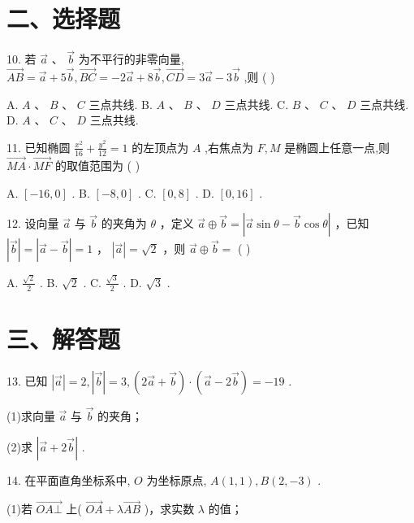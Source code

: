 \section*{二、选择题}

10. 若 $\overrightarrow{a}\text{ 、 }\overrightarrow{b}$ 为不平行的非零向量, $\overrightarrow{AB} = \overrightarrow{a} + 5\overrightarrow{b},\overrightarrow{BC} =  - 2\overrightarrow{a} + 8\overrightarrow{b},\overrightarrow{CD} = 3\overrightarrow{a} - 3\overrightarrow{b}$ ,则 ( )

A. $A\text{ 、 }B\text{ 、 }C$ 三点共线. B. $A\text{ 、 }B\text{ 、 }D$ 三点共线. C. $B\text{ 、 }C\text{ 、 }D$ 三点共线. D. $A\text{ 、 }C\text{ 、 }D$ 三点共线.

11. 已知椭圆 $\frac{{x}^{2}}{16} + \frac{{y}^{2}}{12} = 1$ 的左顶点为 $A$ ,右焦点为 $F,M$ 是椭圆上任意一点,则 $\overrightarrow{MA} \cdot  \overrightarrow{MF}$ 的取值范围为 ( )

A. $\left\lbrack  {-{16},0}\right\rbrack$ . B. $\left\lbrack  {-8,0}\right\rbrack$ . C. $\left\lbrack  {0,8}\right\rbrack$ . D. $\left\lbrack  {0,{16}}\right\rbrack$ .

12. 设向量 $\overrightarrow{a}$ 与 $\overrightarrow{b}$ 的夹角为 $\theta$ ，定义 $\overrightarrow{a} \oplus  \overrightarrow{b} = \left| {\overrightarrow{a}\sin \theta  - \overrightarrow{b}\cos \theta }\right|$ ，已知 $\left| \overrightarrow{b}\right|  = \left| {\overrightarrow{a} - \overrightarrow{b}}\right|  = 1$ ， $\left| \overrightarrow{a}\right|  = \sqrt{2}$ ，则 $\overrightarrow{a} \oplus  \overrightarrow{b} =$ ( )

A. $\frac{\sqrt{2}}{2}$ . B. $\sqrt{2}$ . C. $\frac{\sqrt{3}}{2}$ . D. $\sqrt{3}$ .

\section*{三、解答题}

13. 已知 $\left| \overrightarrow{a}\right|  = 2,\left| \overrightarrow{b}\right|  = 3,\left( {2\overrightarrow{a} + \overrightarrow{b}}\right)  \cdot  \left( {\overrightarrow{a} - 2\overrightarrow{b}}\right)  =  - {19}$ .

(1)求向量 $\overrightarrow{a}$ 与 $\overrightarrow{b}$ 的夹角；

(2)求 $\left| {\overrightarrow{a} + 2\overrightarrow{b}}\right|$ .

14. 在平面直角坐标系中, $O$ 为坐标原点, $A\left( {1,1}\right) ,B\left( {2, - 3}\right)$ .

(1)若 $\overrightarrow{{OA} \bot  }$ 上( $\overrightarrow{OA} + \lambda \overrightarrow{AB}$ )，求实数 $\lambda$ 的值；

